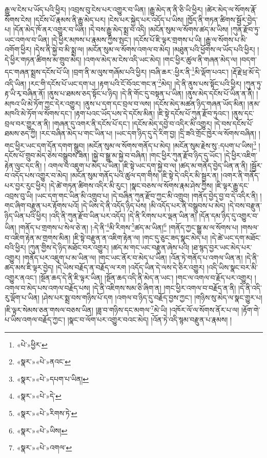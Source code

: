 རྒྱུ་ལ་ངེས་པ་ཡོད་པའི་ཕྱིར། །འབྲས་བུ་ངེས་པར་འགྱུར་བ་ཡིན། །རྒྱུ་མེད་ན་ནི་ཅི་ཡི་ཕྱིར། །ཚེར་མེད་ལ་སོགས་རྣོ་སོགས་ངེས། །དངོས་པོ་རྣམས་ནི་རྒྱུ་མེད་པར། །ངེས་པར་སྐྱེད་པར་འདོད་པ་ཡིས། །ཁྱོད་ནི་གཏན་ཚིགས་སྦྱོར་བྱེད་པ། །དོན་མེད་ཁོ་ནར་འགྱུར་བ་ཡིན། །དེ་བས་རྒྱུ་མེད་སྨྲ་བ་འདི། །མངོན་སུམ་ལ་སོགས་ཚད་མ་ཡིས། །ཀུན་རྫོབ་ཏུ་ཡང་འགལ་བ་ཡིན། །དེ་ཕྱིར་མཁས་པ་རྣམས་ཀྱིས་སྤང་། །དངོས་པོ་ཇི་ལྟར་གྲགས་པ་ཡི། །རྒྱུ་ལ་སོགས་པ་མི་འགོག་ཕྱིར། །དེས་ནི་སྐྱེ་བ་མི་སྨྲ་ལ། །མངོན་སུམ་ལ་སོགས་འགལ་བ་མེད། །མཐུན་པའི་ཕྱོགས་ལ་ཡོད་པའི་ཕྱིར། །དེ་ཕྱིར་གཏན་ཚིགས་མ་གྲུབ་མེད། །འགལ་མེད་མ་ངེས་འདི་ཡང་མེད། །གང་ཕྱིར་ཚུལ་ནི་གཞན་མེད་ལ། །བདག་དང་གཞན་སྨྲས་དངོས་པོ་ཡི། །བྲག་ནི་མ་ལུས་གཞོམ་པའི་ཕྱིར། །བཞི་ཆར་:ཕྱིར་ནི་\footnote{«པེ་»ཕྱིར་}མི་ལྡོག་པའང་། །རྡོ་རྗེ་ཕྲ་མོ་དེ་འདི་ཡིན། །རང་གི་དངོས་པོ་ཡང་དག་པ། །རྟག་པའི་ངོ་བོའང་གང་ན་\footnote{«སྣར་»«པེ་»ནའང་}མེད། །དེ་ནི་ནུས་པས་སྟོང་པའི་ཕྱིར། །ཀུན་ཏུ་རྟ་ཡི་རྭ་བཞིན་ནོ། །ནུས་པ་ཐམས་ཅད་སྟོང་པ་ཉིད། །དེ་ནི་གོང་དུ་བསྟན་པ་ཡིན། །ནུས་མེད་དངོས་པོ་ཡིན་ན་ནི། །མཁའ་ཡི་མེ་ཏོག་ཀྱང་དེར་འགྱུར། །ནུས་པ་དག་དང་བྲལ་བ་ལས། །དངོས་མེད་མཚན་ཉིད་གཞན་ཡོད་མིན། །ནམ་མཁའི་མེ་ཏོག་ལ་སོགས་དང་། །རྟག་པའང་ཡོད་པས་དེ་དངོས་མིན། །ཇི་སྟེ་དངོས་པོ་ཀུན་རྫོབ་ཏུའང་། །ནུས་དང་བྲལ་བར་གྱུར་ན་ནི། །གཞན་དུ་འགར་ནི་དངོས་པོ་དང་། །དངོས་མེད་དབྱེ་བ་འདིར་མི་འགྱུར། །དེ་བས་དངོས་པོ་ཐམས་ཅད་ཀྱི། །རང་བཞིན་མེད་པ་གང་ཡིན་པ། །ཡང་དག་ཉིད་དུ་དེ་རིག་བྱ། །དྲི་ཟའི་གྲོང་ཁྱེར་ལ་སོགས་བཞིན། །གང་ཕྱིར་ཡང་དག་དོན་དགག་སྒྲུབ། །མངོན་སུམ་ལ་སོགས་གནོད་པ་མེད། །མངོན་སུམ་རྗེས་སུ་:དཔག་པ་ཡིས།\footnote{«སྣར་»«པེ་»དཔག་པ་ཡིན།} །དངོས་པོ་གྲུབ་མེད་ཅེས་བསྒྲུབས་ཟིན། །སྐྱེ་བ་སྒྱུ་མ་སྐྱེ་བ་བཞིན། །གང་ཕྱིར་ཀུན་རྫོབ་ཉིད་དུ་ཡོང་། །དེ་ཕྱིར་འཇིག་རྟེན་ལུང་དང་ནི། །
འགལ་བ་འཇུག་པ་མེད་པ་ཡིན། །ཇི་སྟེ་ཡང་དག་སྐྱེ་བ་ལ། །ཚད་མ་གནོད་བྱེད་ཡིན་ན་ནི། །སྦྱོར་བ་འདོད་པས་འགྱུར་བ་མེད། །མངོན་སུམ་གནོད་པའི་ཚུལ་དག་གིས། །ཇི་སྟེ་དེ་འདིར་མི་སྦྱར་ན། །འགར་ནི་གནོད་པར་བྱར་རུང་ཕྱིར། །དེ་ཚེ་གཏན་ཚིགས་འདིར་མི་རུང་། །སྣང་བཅས་ལ་སོགས་རྣམ་ཤེས་ཀྱིས། །ཇི་ལྟར་རྒྱུ་དང་འབྲས་བུ་ཡི། །ཡང་དག་གང་ཡིན་མི་འགྲུབ་པ། །དེ་བཞིན་ཀུན་རྫོབ་ཀྱང་མི་འགྲུབ། །གནོད་བྱེད་བྱ་བ་དེ་འདིར་ནི། །གང་ཞིག་བརྫུན་པར་རྟོགས་པའོ། །དེ་ཡིས་དེ་ནི་འདོད་ཉིད་པས། །མི་འདོད་པར་ནི་བསྒྲུབས་པ་མེད། །དེ་བས་བརྫུན་ཉིད་ཡིན་པའི་ཕྱིར། །འདི་ནི་ཀུན་རྫོབ་ཡིན་པར་འདོད། །དེ་ནི་རིགས་པར་ལྡན་ཡིན་ན། །དོན་དམ་ཉིད་དུ་འགྱུར་བ་ཡིན། །གནོད་པ་གྲགས་པ་སེལ་ཅེ་ན། །:དེ་ནི་\footnote{«སྣར་»«པེ་»དེ་}མི་རིགས་\footnote{«སྣར་»«པེ་»རིགས་ཏེ་}ཚད་མ་ཡིན།\footnote{«སྣར་»«པེ་»ཡིས།} །གནོད་ཀྱང་སྒྱུ་མ་ལ་སོགས་པ། །གསལ་བ་འཇིག་རྟེན་མ་གྲགས་མིན། །ཇི་སྟེ་བརྫུན་ན་འཇིག་རྟེན་ལ། །གང་དུ་ཅུང་ཟད་སྣང་མེད་པ། །དེ་ཚེ་ཡང་དག་མཐོང་བའི་ཕྱིར། །ཀུན་གྱིས་དེ་ཉིད་མཐོང་བར་འགྱུར། །ཚད་མ་གང་ཡང་བརྫུན་ཞེས་པའི། །ཐ་སྙད་བྱར་ཡང་མེད་པར་འགྱུར། །གནོད་པར་འཇུག་པ་མ་ཡིན་ལ། །གང་ཡང་ནོར་བ་མེད་པ་ཡིན། །འོན་ཏེ་གནོད་པ་འགལ་ཡིན་ན། །དེ་ནི་ཚད་མས་ཇི་ལྟར་བྱེད། །དེ་ཡིས་བརྗོད་ན་བརྗོད་ལ་རག །འདོད་ཡིན་དེ་ལས་དེ་ཅིར་འགྱུར། །འདི་ཡིས་སྣང་བར་མི་འགྱུར་ནའང་། །སྔོན་ཆད་དེ་ནི་ཇི་ལྟར་ཡིན། །སྔོན་ཆད་འདི་ནི་མེད་ན་ཡང་། །གང་ལ་འགལ་བ་རྗོད་པར་འགྱུར། །འགལ་བ་མེད་པས་འགལ་བརྗོད་པས། །དེ་ནི་འཇིགས་སམ་ཅི་ཞིག་ན། །གང་ཕྱིར་འགལ་བ་བརྗོད་ན་ནི། །དེ་ནི་འདི་རུ་ལྡོག་པ་ཡིན། །ཤེས་པར་སྨྲ་བས་གཉིས་པོ་དག །འགལ་བ་ཉིད་དུ་བརྗོད་བྱས་ཀྱང་། །གཉིས་སུ་མེད་ལ་སྣང་གྱུར་པ། །ཇི་ལྟར་སེམས་ཅན་གསལ་བཅས་ཡིན། །ཟླ་བ་གཉིས་དང་མགལ་\footnote{«སྣར་»«པེ་»འགལ་}མེ་ཡི། །འཁོར་ལོ་ལ་སོགས་ནོར་པ་ལ། །རྟོག་གེ་པ་ཡིས་འགལ་བརྗོད་ཀྱང་། །སྣང་བ་ལོག་པར་འགྱུར་བའང་མེད། །འོན་ཏེ་འདི་སྙམ་བརྫུན་པ་རྣམས། །
